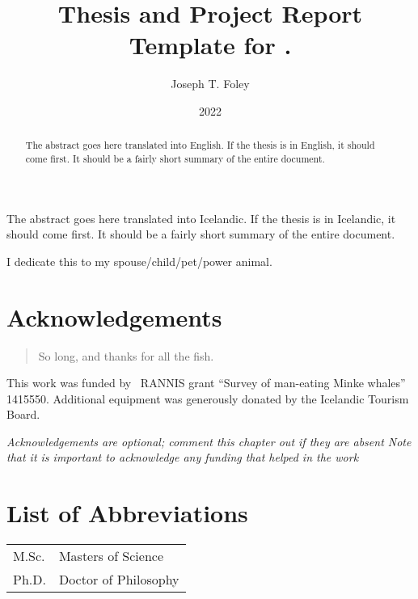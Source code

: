 \documentclass[12pt,a4paper,titlepage]{memoir}
\title{Thesis and Project Report Template for \theInstitution{}.}
\author{Joseph T. Foley}%
\date{2022}{2}{2}%
\begin{document}
\maketitle{}
\copyrightpage{}
\signaturepage{}
\archivesigpage{}

\begin{abstract}
  The abstract goes here translated into English.
  If the thesis is in English, it should come first.
  It should be a fairly short summary of the entire document.
\end{abstract}

\begin{abstractIS}
  The abstract goes here translated into Icelandic.
  If the thesis is in Icelandic, it should come first.
  It should be a fairly short summary of the entire document.
\end{abstractIS}

\begin{dedications}
  I dedicate this to my spouse/child/pet/power animal.
\end{dedications}

\enableindents{}%

\chapter*{Acknowledgements} 
\begin{quotation}
So long, and thanks for all the fish.
\end{quotation}
\vspace{\baselineskip}

This work was funded by \the\year~RANNIS grant ``Survey of man-eating Minke whales'' 1415550.
Additional equipment was generously donated by the Icelandic Tourism Board.

{\em Acknowledgements are optional; comment this chapter out if they are absent
  Note that it is important to acknowledge any funding that helped in the work\/}
\clearpage{}
\tableofcontents{}\clearpage
\listoffigures{}\clearpage
\listoftables{}\clearpage

\chapter*{List of Abbreviations}%
\begin{tabular}{ll}
M.Sc. &Masters of Science\\
Ph.D. &Doctor of Philosophy\\
\end{tabular}
\end{document}

